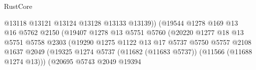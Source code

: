 \begin{lexlean}{RustCore}
\begin{coremodule}
                                                  @13118
                                                  @13121
                                                  @13124
                                                  @13128
                                                  @13133
                                                  @13139))
                                              (@19544
                                                @1278
                                                @169
                                                @13
                                                @16
                                                @5762
                                                @2150
                                                (@19407
                                                  @1278
                                                  @13
                                                  @5751
                                                  @5760
                                                  (@20220
                                                    @1277
                                                    @18
                                                    @13
                                                    @5751
                                                    @5758
                                                    @2303
                                                    (@19290
                                                      @1275
                                                      @1122
                                                      @13
                                                      @17
                                                      @5737
                                                      @5750
                                                      @5757
                                                      @2108
                                                      @1637
                                                      @2049
                                                      (@19325
                                                        @1274
                                                        @5737
                                                        (@11682 (@11683 @5737))
                                                        (@11566 (@11688 @1274 @13)))
                                                      (@20695
                                                        @5743
                                                        @2049
                                                        @19394

\end{coremodule}
\end{lexlean}
